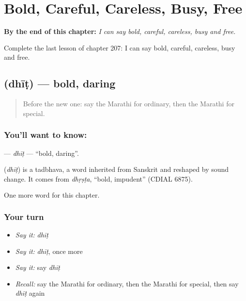 
\chapter{Bold, Careful, Careless, Busy, Free}
\label{ch:mr-bold-careful-careless-busy-free}

\begin{chapteropening}
\textbf{By the end of this chapter:} \emph{I can say bold, careful, careless, busy and free.}

Complete the last lesson of chapter 207: I can say bold, careful, careless, busy and free.
\end{chapteropening}

\section[\texorpdfstring{\mr{धीट} (dhīṭ)}{धीट (dhīṭ)}]{ (dhīṭ) — bold, daring}

\label{lesson:MR-C207-dhit}



\begin{quote}
Before the new one: say the Marathi for ordinary, then the Marathi for special.
\end{quote}

\subsection*{You'll want to know: }
\textbf{} — \emph{dhīṭ} — \textquotedblleft{}bold, daring\textquotedblright{}.

\begin{cousinweb}
\textbf{} (\emph{dhīṭ}) is a tadbhava, a word inherited from Sanskrit and reshaped by sound change. It comes from \emph{dhṛṣṭa}, \textquotedblleft{}bold, impudent\textquotedblright{} (CDIAL 6875).
\end{cousinweb}

\begin{grammarlens}[title={What you've built}]
One more word for this chapter.
\end{grammarlens}

\subsection*{Your turn}
\begin{itemize}
\raggedright
  \item \emph{Say it:} \emph{dhīṭ}
  \item \emph{Say it:} \emph{dhīṭ}, once more
  \item \emph{Say it:} say \emph{dhīṭ}
  \item \emph{Recall:} say the Marathi for ordinary, then the Marathi for special, then say \emph{dhīṭ} again
\end{itemize}

